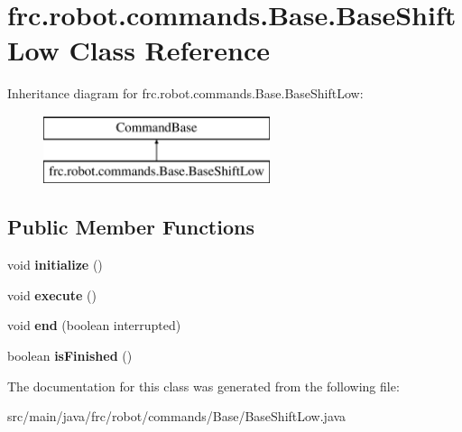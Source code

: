 \hypertarget{classfrc_1_1robot_1_1commands_1_1_base_1_1_base_shift_low}{}\section{frc.\+robot.\+commands.\+Base.\+Base\+Shift\+Low Class Reference}
\label{classfrc_1_1robot_1_1commands_1_1_base_1_1_base_shift_low}
Inheritance diagram for frc.\+robot.\+commands.\+Base.\+Base\+Shift\+Low\+:\begin{figure}[H]
\begin{center}
\leavevmode
\includegraphics[height=2.000000cm]{classfrc_1_1robot_1_1commands_1_1_base_1_1_base_shift_low}
\end{center}
\end{figure}
\subsection*{Public Member Functions}
\begin{DoxyCompactItemize}
\item 
\mbox{\label{classfrc_1_1robot_1_1commands_1_1_base_1_1_base_shift_low_a48fc4afe890f7b95bcdb2dadfb0212f2}} 
void {\bfseries initialize} ()
\item 
\mbox{\label{classfrc_1_1robot_1_1commands_1_1_base_1_1_base_shift_low_abd708962328a1442f32989c951e65f82}} 
void {\bfseries execute} ()
\item 
\mbox{\label{classfrc_1_1robot_1_1commands_1_1_base_1_1_base_shift_low_a5ca1acb604168b7c8eca41001d2b1f80}} 
void {\bfseries end} (boolean interrupted)
\item 
\mbox{\label{classfrc_1_1robot_1_1commands_1_1_base_1_1_base_shift_low_aa99f295c3117bc3491c4f0cbc826eb92}} 
boolean {\bfseries is\+Finished} ()
\end{DoxyCompactItemize}


The documentation for this class was generated from the following file\+:\begin{DoxyCompactItemize}
\item 
src/main/java/frc/robot/commands/\+Base/Base\+Shift\+Low.\+java\end{DoxyCompactItemize}
